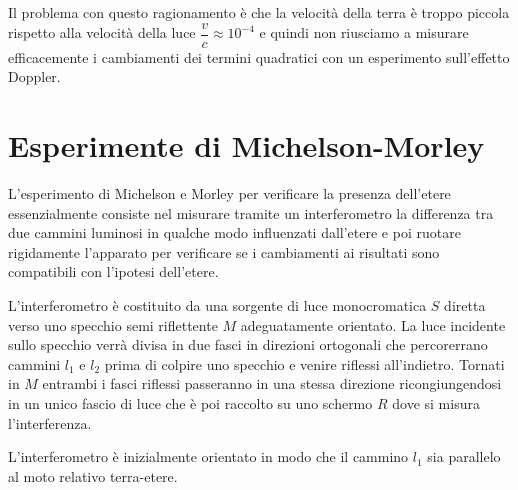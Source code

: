 \documentclass[12pt,a4paper,titlepage, twoside, openright]{book}
\numberwithin{equation}{chapter}
\begin{document}
Il problema con questo ragionamento è che la velocità della terra è troppo piccola rispetto alla velocità della luce $\dfrac{v}{c}\approx 10^{-4}$ e quindi non riusciamo a misurare efficacemente i cambiamenti dei termini quadratici con un esperimento sull'effetto Doppler.

\section{Esperimente di Michelson-Morley}
L'esperimento di Michelson e Morley per verificare la presenza dell'etere essenzialmente consiste nel misurare tramite un interferometro la differenza tra due cammini luminosi in qualche modo influenzati dall'etere e poi ruotare rigidamente l'apparato per verificare se i cambiamenti ai risultati sono compatibili con l'ipotesi dell'etere.

L'interferometro è costituito da una sorgente di luce monocromatica $S$ diretta verso uno specchio semi riflettente $M$ adeguatamente orientato. La luce incidente sullo specchio verrà divisa in due fasci in direzioni ortogonali che percorerrano cammini $l_1$ e $l_2$ prima di colpire uno specchio e venire riflessi all'indietro. Tornati in $M$ entrambi i fasci riflessi passeranno in una stessa direzione ricongiungendosi in un unico fascio di luce che è poi raccolto su uno schermo $R$ dove si misura l'interferenza.

L'interferometro è inizialmente orientato in modo che il cammino $l_1$ sia parallelo al moto relativo terra-etere.
\end{document}

